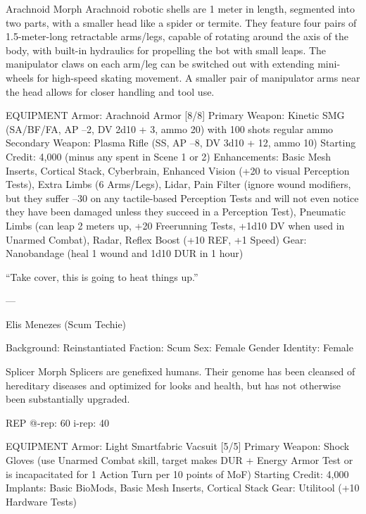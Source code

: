 Arachnoid Morph
Arachnoid robotic shells are 1 meter in length, segmented into two parts, with a smaller head like a spider or termite. They feature four pairs of 1.5-meter-long retractable arms/legs, capable of rotating around the axis of the body, with built-in hydraulics for propelling the bot with small leaps. The manipulator claws on each arm/leg can be switched out with extending mini-wheels for high-speed skating movement. A smaller pair of manipulator arms near the head allows for closer handling and tool use.

EQUIPMENT
Armor: Arachnoid Armor [8/8]
Primary Weapon: Kinetic SMG (SA/BF/FA, AP –2, DV 2d10 + 3, ammo 20) with 100 shots regular ammo
Secondary Weapon: Plasma Rifle (SS, AP –8, DV 3d10 + 12, ammo 10)
Starting Credit: 4,000 (minus any spent in Scene 1 or 2)
Enhancements: Basic Mesh Inserts, Cortical Stack, Cyberbrain, Enhanced Vision (+20 to visual Perception Tests), Extra Limbs (6 Arms/Legs), Lidar, Pain Filter (ignore wound modifiers, but they suffer –30 on any tactile-based Perception Tests and will not even notice they have been damaged unless they succeed in a Perception Test), Pneumatic Limbs (can leap 2 meters up, +20 Freerunning Tests, +1d10 DV when used in Unarmed Combat), Radar, Reflex Boost (+10 REF, +1 Speed)
Gear: Nanobandage (heal 1 wound and 1d10 DUR in 1 hour)

“Take cover, this is going to heat things up.”

---

Elis Menezes (Scum Techie)

Background: Reinstantiated
Faction: Scum
Sex: Female
Gender Identity: Female

Splicer Morph
Splicers are genefixed humans. Their genome has been cleansed of hereditary diseases and optimized for looks and health, but has not otherwise been substantially upgraded.

REP
@-rep:	60
i-rep:	40

EQUIPMENT
Armor: Light Smartfabric Vacsuit [5/5]
Primary Weapon: Shock Gloves (use Unarmed Combat skill, target makes DUR + Energy Armor Test or is incapacitated for 1 Action Turn per 10 points of MoF)
Starting Credit: 4,000
Implants: Basic BioMods, Basic Mesh Inserts, Cortical Stack
Gear: Utilitool (+10 Hardware Tests)

